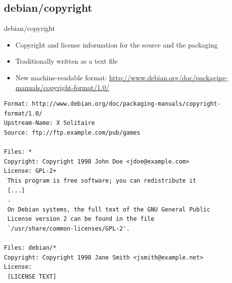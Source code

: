 \documentclass[10pt,final]{beamer}
\begin{document}
\subsection{debian/copyright}
\begin{frame}[fragile=singleslide]{debian/copyright}
  \hbr
  \begin{itemize}
  \item Copyright and license information for the source and the packaging
  \item Traditionally written as a text file
  \item New machine-readable format:
    {\small\url{http://www.debian.org/doc/packaging-manuals/copyright-format/1.0/}}
  \end{itemize}
  \seprule
  \begin{lstlisting}[basicstyle=\ttfamily\scriptsize]
Format: http://www.debian.org/doc/packaging-manuals/copyright-format/1.0/
Upstream-Name: X Solitaire
Source: ftp://ftp.example.com/pub/games

Files: *
Copyright: Copyright 1998 John Doe <jdoe@example.com>
License: GPL-2+
 This program is free software; you can redistribute it
 [...]
 .
 On Debian systems, the full text of the GNU General Public
 License version 2 can be found in the file
 `/usr/share/common-licenses/GPL-2'.

Files: debian/*
Copyright: Copyright 1998 Jane Smith <jsmith@example.net>
License:
 [LICENSE TEXT]
\end{lstlisting}
\end{frame}
\end{document}
